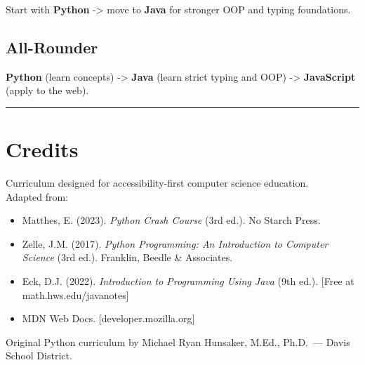 Start with \textbf{Python} -\textgreater{} move to \textbf{Java} for
stronger OOP and typing foundations.

\subsection{All-Rounder}\label{all-rounder}

\textbf{Python} (learn concepts) -\textgreater{} \textbf{Java} (learn
strict typing and OOP) -\textgreater{} \textbf{JavaScript} (apply to the
web).

\begin{center}\rule{0.5\linewidth}{0.5pt}\end{center}

\section{Credits}\label{credits}

Curriculum designed for accessibility-first computer science
education.\\
Adapted from:

\begin{itemize}
\tightlist
\item
  Matthes, E. (2023). \emph{Python Crash Course} (3rd ed.). No Starch
  Press.
\item
  Zelle, J.M. (2017). \emph{Python Programming: An Introduction to
  Computer Science} (3rd ed.). Franklin, Beedle \& Associates.
\item
  Eck, D.J. (2022). \emph{Introduction to Programming Using Java} (9th
  ed.). {[}Free at math.hws.edu/javanotes{]}
\item
  MDN Web Docs. {[}developer.mozilla.org{]}
\end{itemize}

Original Python curriculum by Michael Ryan Hunsaker, M.Ed., Ph.D.~---
Davis School District.

